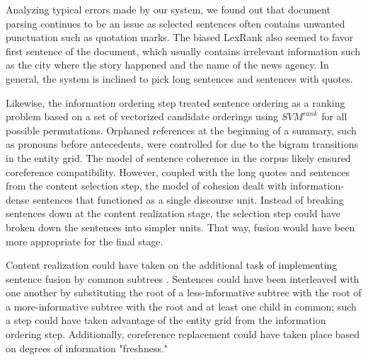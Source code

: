 \documentclass[11pt,a4paper]{article}
\begin{document}
Analyzing typical errors made by our system, we found out that document parsing continues to be an issue as selected sentences often contains unwanted punctuation such as quotation marks. The biased LexRank also seemed to favor first sentence of the document, which usually contains irrelevant information such as the city where the story happened and the name of the news agency. In general, the system is inclined to pick long sentences and sentences with quotes. 

Likewise, the information ordering step treated sentence ordering as a ranking problem based on a set of vectorized candidate orderings using
$SVM^{rank}$ for all possible permutations. Orphaned references at the beginning of a summary, such as pronouns before antecedents, were controlled for due to the bigram transitions in the entity grid. The model of sentence coherence in the corpus likely ensured coreference compatibility. However, coupled with the long quotes and sentences from the content selection step, the model of cohesion dealt with information-dense sentences that functioned as a single discourse unit. Instead of breaking sentences down at the content realization stage, the selection step could have broken down the sentences into simpler units. That way, fusion would have been more appropriate for the final stage.

Content realization could have taken on the additional task of implementing sentence fusion by common subtrees \cite{BarzilayMckeown05}. Sentences could have been interleaved with one another by substituting the root of a less-informative subtree with the root of a more-informative subtree with the root and at least one child in common; such a step could have taken advantage of the entity grid from the information ordering step. Additionally, coreference replacement could have taken place based on degrees of information "freshness."
 
\end{document}
